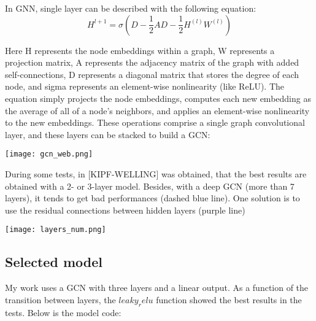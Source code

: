 \documentclass[a4paper,14pt]{article}
\begin{document}
In GNN, single layer can be described with the following equation:
\begin{equation}
H^{l+1} = \sigma(D - \frac{1}{2}AD - \frac{1}{2}H^{(l)}W^{(l)})
\end{equation}

Here H represents the node embeddings within a graph, W represents a projection matrix, A represents the adjacency matrix of the graph with added self-connections, D represents a diagonal matrix that stores the degree of each node, and sigma represents an element-wise nonlinearity (like ReLU). The equation simply projects the node embeddings, computes each new embedding as the average of all of a node’s neighbors, and applies an element-wise nonlinearity to the new embeddings. These operations comprise a single graph convolutional layer, and these layers can be stacked to build a GCN:

\texttt{[image: gcn\_web.png]}

During some tests, in [KIPF-WELLING] was obtained, that the best results are obtained with a 2- or 3-layer model. Besides, with a deep GCN (more than 7 layers), it tends to get bad performances (dashed blue line). One solution is to use the residual connections between hidden layers (purple line)

\texttt{[image: layers\_num.png]}

\subsection{Selected model}
My work uses a GCN with three layers and a linear output. As a function of the transition between layers, the $leaky_relu$ function showed the best results in the tests. Below is the model code:
\end{document}
